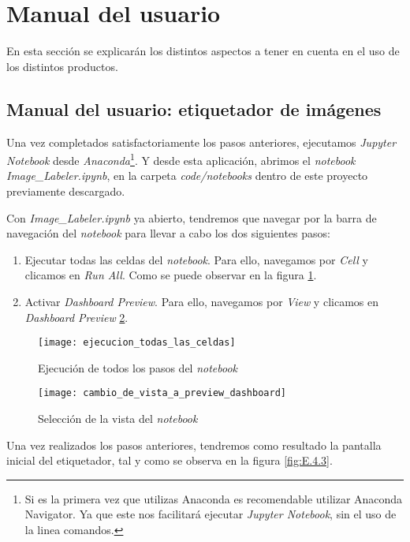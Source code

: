 \section{Manual del usuario}

En esta sección se explicarán los distintos aspectos a tener en cuenta en el uso de los distintos productos.

\subsection{Manual del usuario: etiquetador de imágenes}

Una vez completados satisfactoriamente los pasos anteriores,  ejecutamos \textit{Jupyter Notebook} desde \textit{Anaconda}\footnote{ Si es la primera vez que utilizas Anaconda es recomendable utilizar Anaconda Navigator. Ya que este nos facilitará ejecutar \textit{Jupyter Notebook}, sin el uso de la linea comandos.}. Y desde esta aplicación, abrimos el \textit{notebook} \textit{Image\_Labeler.ipynb}, en la carpeta \textit{code/notebooks} dentro de este proyecto previamente descargado.

Con \textit{Image\_Labeler.ipynb} ya abierto, tendremos que navegar por la barra de navegación del \textit{notebook} para llevar a cabo los dos siguientes pasos:

\begin{enumerate}[1.]
    \item Ejecutar todas las celdas del \textit{notebook}.  Para ello, navegamos por \textit{Cell} y clicamos en \textit{Run All}. Como se puede observar en la figura \ref{fig:E.4.1}.
    \item Activar \textit{Dashboard Preview}. Para ello, navegamos por \textit{View} y clicamos en \textit{Dashboard Preview} \ref{fig:E.4.2}.
\end{enumerate}

\begin{figure}[h]
\centering
\texttt{[image: ejecucion\_todas\_las\_celdas]}
\caption{Ejecución de todos los pasos del \textit{notebook}}
\label{fig:E.4.1}
\end{figure}

\begin{figure}[h]
\centering
\texttt{[image: cambio\_de\_vista\_a\_preview\_dashboard]}
\caption{Selección de la vista del \textit{notebook}}
\label{fig:E.4.2}
\end{figure}

Una vez realizados los pasos anteriores, tendremos como resultado la pantalla inicial del etiquetador, tal y como se observa en la figura \ref{fig:E.4.3}.

